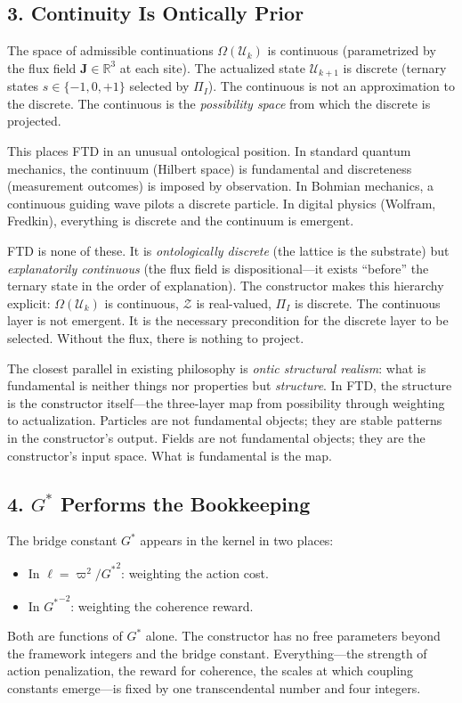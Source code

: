 \documentclass[11pt,a4paper]{article}
\newcommand{\Gstar}{{G^{*}}}
\newcommand{\vpi}{\varpi}
\newcommand{\RR}{\mathbb{R}}
\newcommand{\UU}{\mathcal{U}}
\newcommand{\OO}{\Omega}
\newcommand{\PP}{\Pi}
\newcommand{\onticell}{\ell}
\theoremstyle{compact}
\begin{document}
\subsection*{3. Continuity Is Ontically Prior}

The space of admissible continuations $\OO(\UU_k)$ is continuous (parametrized by the flux field $\mathbf{J} \in \RR^3$ at each site). The actualized state $\UU_{k+1}$ is discrete (ternary states $s \in \{-1, 0, +1\}$ selected by $\PP_I$). The continuous is not an approximation to the discrete. The continuous is the \emph{possibility space} from which the discrete is projected.

This places FTD in an unusual ontological position. In standard quantum mechanics, the continuum (Hilbert space) is fundamental and discreteness (measurement outcomes) is imposed by observation. In Bohmian mechanics, a continuous guiding wave pilots a discrete particle. In digital physics (Wolfram, Fredkin), everything is discrete and the continuum is emergent.

FTD is none of these. It is \emph{ontologically discrete} (the lattice is the substrate) but \emph{explanatorily continuous} (the flux field is dispositional---it exists ``before'' the ternary state in the order of explanation). The constructor makes this hierarchy explicit: $\OO(\UU_k)$ is continuous, $\mathcal{Z}$ is real-valued, $\PP_I$ is discrete. The continuous layer is not emergent. It is the necessary precondition for the discrete layer to be selected. Without the flux, there is nothing to project.

The closest parallel in existing philosophy is \emph{ontic structural realism}: what is fundamental is neither things nor properties but \emph{structure}. In FTD, the structure is the constructor itself---the three-layer map from possibility through weighting to actualization. Particles are not fundamental objects; they are stable patterns in the constructor's output. Fields are not fundamental objects; they are the constructor's input space. What is fundamental is the map.

\subsection*{4. $\Gstar$ Performs the Bookkeeping}

The bridge constant $\Gstar$ appears in the kernel in two places:
\begin{itemize}[nosep]
\item In $\onticell = \vpi^2/{G^*}^2$: weighting the action cost.
\item In ${G^*}^{-2}$: weighting the coherence reward.
\end{itemize}
Both are functions of $\Gstar$ alone. The constructor has no free parameters beyond the framework integers and the bridge constant. Everything---the strength of action penalization, the reward for coherence, the scales at which coupling constants emerge---is fixed by one transcendental number and four integers.
\end{document}
